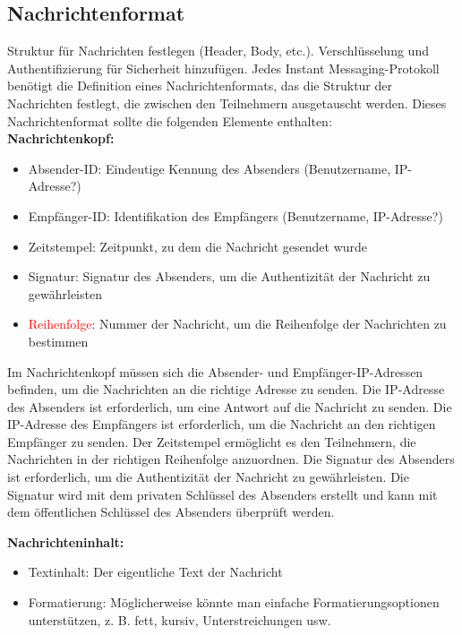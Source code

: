 \subsection{Nachrichtenformat}

Struktur für Nachrichten festlegen (Header, Body, etc.).
Verschlüsselung und Authentifizierung für Sicherheit hinzufügen.
Jedes Instant Messaging-Protokoll benötigt die Definition eines Nachrichtenformats,
das die Struktur der Nachrichten festlegt, die zwischen den Teilnehmern ausgetauscht werden.
Dieses Nachrichtenformat sollte die folgenden Elemente enthalten:
\\

\noindent \textbf{Nachrichtenkopf:}
\begin{itemize}
    \item Absender-ID: Eindeutige Kennung des Absenders (Benutzername, IP-Adresse?)
    \item Empfänger-ID: Identifikation des Empfängers (Benutzername, IP-Adresse?)
    \item Zeitstempel: Zeitpunkt, zu dem die Nachricht gesendet wurde
    \item Signatur: Signatur des Absenders, um die Authentizität der Nachricht zu gewährleisten
    \item \textcolor{red}{Reihenfolge}: Nummer der Nachricht, um die Reihenfolge der Nachrichten zu bestimmen
\end{itemize}

\noindent Im Nachrichtenkopf müssen sich die Absender- und Empfänger-IP-Adressen befinden, um die Nachrichten an die richtige Adresse zu senden. Die IP-Adresse des Absenders ist erforderlich, um eine Antwort auf die Nachricht zu senden. Die IP-Adresse des Empfängers ist erforderlich, um die Nachricht an den richtigen Empfänger zu senden. Der Zeitstempel ermöglicht es den Teilnehmern, die Nachrichten in der richtigen Reihenfolge anzuordnen. Die Signatur des Absenders ist erforderlich, um die Authentizität der Nachricht zu gewährleisten. Die Signatur wird mit dem privaten Schlüssel des Absenders erstellt und kann mit dem öffentlichen Schlüssel des Absenders überprüft werden.


\noindent \textbf{Nachrichteninhalt:}
\begin{itemize}
    \item Textinhalt: Der eigentliche Text der Nachricht
    \item Formatierung: Möglicherweise könnte man einfache Formatierungsoptionen 
    unterstützen, z. B. fett, kursiv, Unterstreichungen usw.
\end{itemize}

